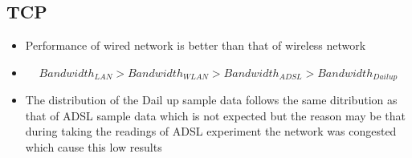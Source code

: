 \documentclass[aps,letterpaper,10pt]{revtex4}
\begin{document}
        \subsection{TCP}    
            \begin{figure}[htp]
                    \begin{center}
                    \end{center}    
                \end{figure}   
            \vspace{3mm}
            \begin{center}
                \begin{itemize}
                    \item Performance of wired network is better than that of wireless network
                    \item \[ Bandwidth_{LAN} > Bandwidth_{WLAN} > Bandwidth_{ADSL} > Bandwidth_{Dail up}\]
                    \item The distribution of the Dail up sample data follows the same ditribution as that of ADSL sample data which is not expected but the reason may be that during taking the readings of ADSL experiment the network was congested which cause this low results
                \end{itemize}
            \end{center}

\newpage
\end{document}
